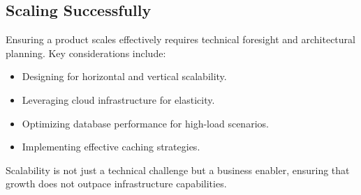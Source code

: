 

\subsection{Scaling Successfully}
Ensuring a product scales effectively requires technical foresight and architectural planning. Key considerations include:

\begin{itemize}
    \item Designing for horizontal and vertical scalability.
    \item Leveraging cloud infrastructure for elasticity.
    \item Optimizing database performance for high-load scenarios.
    \item Implementing effective caching strategies.
\end{itemize}

Scalability is not just a technical challenge but a business enabler, ensuring that growth does not outpace infrastructure capabilities.
